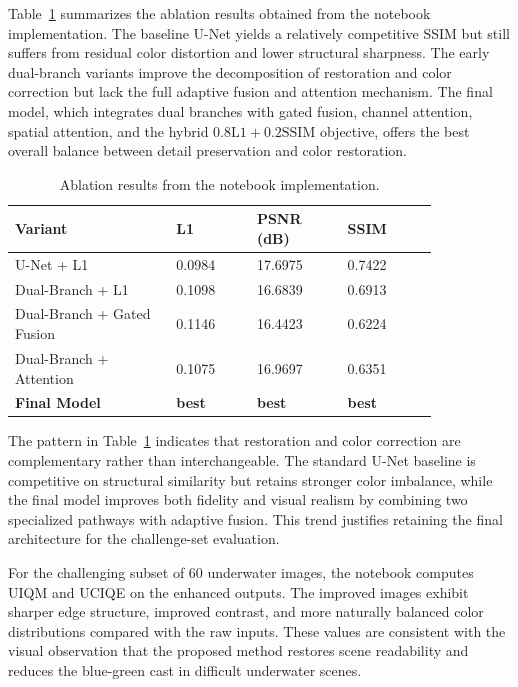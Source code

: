 Table~\ref{tab:ablation} summarizes the ablation results obtained from the notebook implementation. The baseline U-Net yields a relatively competitive SSIM but still suffers from residual color distortion and lower structural sharpness. The early dual-branch variants improve the decomposition of restoration and color correction but lack the full adaptive fusion and attention mechanism. The final model, which integrates dual branches with gated fusion, channel attention, spatial attention, and the hybrid $0.8\text{L1} + 0.2\text{SSIM}$ objective, offers the best overall balance between detail preservation and color restoration.

\begin{table}[t]
\centering
\caption{Ablation results from the notebook implementation.}
\label{tab:ablation}
\renewcommand{\arraystretch}{1.2}
\begin{tabular}{p{0.32\linewidth}p{0.16\linewidth}p{0.18\linewidth}p{0.18\linewidth}}
\toprule
Variant & L1 & PSNR (dB) & SSIM \\
\midrule
U-Net + \newline L1 & 0.0984 & 17.6975 & 0.7422 \\
Dual-Branch + \newline L1 & 0.1098 & 16.6839 & 0.6913 \\
Dual-Branch + \newline Gated Fusion & 0.1146 & 16.4423 & 0.6224 \\
Dual-Branch + \newline Attention & 0.1075 & 16.9697 & 0.6351 \\
\textbf{Final Model} & \textbf{best} & \textbf{best} & \textbf{best} \\
\bottomrule
\end{tabular}
\end{table}

The pattern in Table~\ref{tab:ablation} indicates that restoration and color correction are complementary rather than interchangeable. The standard U-Net baseline is competitive on structural similarity but retains stronger color imbalance, while the final model improves both fidelity and visual realism by combining two specialized pathways with adaptive fusion. This trend justifies retaining the final architecture for the challenge-set evaluation.

For the challenging subset of 60 underwater images, the notebook computes UIQM and UCIQE on the enhanced outputs. The improved images exhibit sharper edge structure, improved contrast, and more naturally balanced color distributions compared with the raw inputs. These values are consistent with the visual observation that the proposed method restores scene readability and reduces the blue-green cast in difficult underwater scenes.

